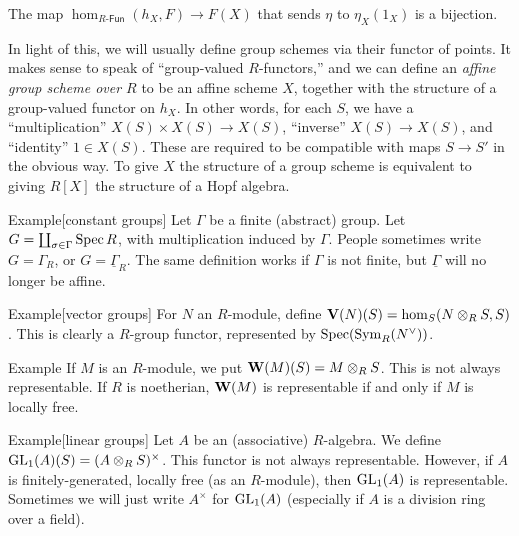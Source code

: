 \begin{lemm}[Yoneda]
The map $\hom_{R\text{-}\mathsf{Fun}}(h_X,F) \to F(X)$ that sends 
$\eta$ to $\eta_X(1_X)$ is a bijection. 
\end{lemm}

In light of this, we will usually define group schemes via their functor of 
points. It makes sense to speak of ``group-valued $R$-functors,'' and we can 
define an \emph{affine group scheme over $R$} to be an affine scheme $X$, 
together with the structure of a group-valued functor on $h_X$. In other words, 
for each $S$, we have a ``multiplication'' $X(S)\times X(S) \to X(S)$, 
``inverse'' $X(S) \to X(S)$, and ``identity'' $1\in X(S)$. These are required 
to be compatible with maps $S\to S'$ in the obvious way. To give $X$ the 
structure of a group scheme is equivalent to giving $R[X]$ the structure of a 
Hopf algebra. 

\begin{enonce}[remark]{Example}[constant groups]
Let $\Gamma$ be a finite (abstract) group. Let 
$G=\coprod_{\sigma\in \Gamma}\operatorname{Spec} R$, with multiplication induced by 
$\Gamma$. People sometimes write $G=\Gamma_R$, or $G=\underline\Gamma_R$. The 
same definition works if $\Gamma$ is not finite, but $\underline\Gamma$ will no 
longer be affine. 
\end{enonce}

\begin{enonce}[remark]{Example}[vector groups]
For $N$ an $R$-module, define $\mathbf{V}(N)(S)=\hom_S(N\otimes_R S,S)$. This is 
clearly a $R$-group functor, represented by 
$\operatorname{Spec}(\operatorname{Sym}_R(N^\vee))$. 
\end{enonce}

\begin{enonce}[remark]{Example}
If $M$ is an $R$-module, we put $\mathbf{W}(M)(S)=M\otimes_R S$. This is not always 
representable. If $R$ is noetherian, $\mathbf{W}(M)$ is representable if and only if 
$M$ is locally free. 
\end{enonce}

\begin{enonce}[remark]{Example}[linear groups]
Let $A$ be an (associative) $R$-algebra. We define 
$\operatorname{GL}_1(A)(S) = (A\otimes_R S)^\times$. This functor is not always 
representable. However, if $A$ is finitely-generated, locally free (as an 
$R$-module), then $\operatorname{GL}_1(A)$ is representable. Sometimes we will 
just write $A^\times$ for $\operatorname{GL}_1(A)$ (especially if $A$ is a 
division ring over a field). 
\end{enonce}

